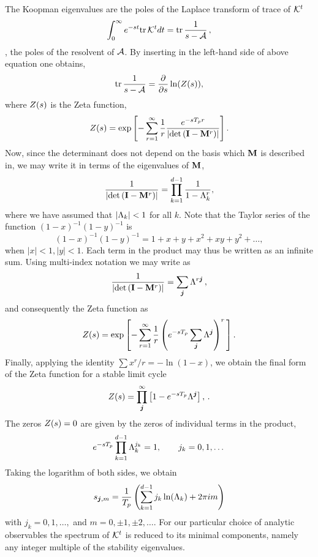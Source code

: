 \begin{description}
The Koopman eigenvalues are the poles of the
Laplace transform of trace of ${\cal K}^t$
%
\[
\int_0^\infty e^{-st} \mbox{\rm tr}\, {\cal K}^t dt =\mbox{\rm tr}\, \frac{1}{s-{\cal A}}
\,,
\]
%
\ie, the poles of the
resolvent of ${\cal A}$. By inserting  in the
left-hand side of above equation one obtains,
%
\[
\mbox{\rm tr}\, \frac{1}{s-{\cal A}} = \frac{\partial }{\partial s} \ln (Z(s)),
\]
%
where $Z(s)$ is the Zeta function,
%
\[
Z(s) = \exp \left [-\sum_{r=1}^\infty\frac {1}{r} \frac{e^{-s{T_{p}} r}}{|\mbox{\rm det}\,({\bf\mathbf{I}}-{\bf\mathbf{M}}^r)|}
         \right ].
\]
%
Now, since the determinant does not depend on the basis which ${\bf\mathbf{M}}$
is described in, we may write it in terms of the eigenvalues of
${\bf\mathbf{M}}$,
%
\begin{equation}
\frac{1}{|\mbox{\rm det}\, ({\bf\mathbf{I}}- {\bf\mathbf{M}}^r)|} = \prod_{k=1}^{d-1} \frac{1}{1-\Lambda_k^r},
\label{eq:prod2sum}
\end{equation}
%
where we have assumed that $|\Lambda_k|<1$ for all $k$. Note that
the Taylor series of the function $(1-x)^{-1}(1-y)^{-1} $ is
%
\[
(1-x)^{-1}(1-y)^{-1} = 1+x+y+ x^2 + xy + y^2+\dots,
\]
%
when $|x|<1,|y|<1$. Each term in the product  may
thus be written as an infinite sum.
Using multi-index notation  we may write
 as
%
\[
\frac{1}{|\mbox{\rm det}\,({\bf\mathbf{I}}-{\bf\mathbf{M}}^r)|}
= \sum_{{\boldsymbol j}} \Lambda^{r{\boldsymbol j}}
\,,
\]
%
and consequently the Zeta function  as
%
\[
Z(s) = \exp \left [-\sum_{r=1}^\infty\frac {1}{r}
  \left (e^{-s{T_{p}}}  \sum_{{\boldsymbol j}} \Lambda^{\boldsymbol j} \right )^r
             \,\right].
\]
%
Finally,  applying the identity $\sum x^r/r= -\ln(1-x)$,  we obtain
the final form of the Zeta function for a stable limit cycle
%
%
\begin{equation}
Z(s) 	= \prod_{{\boldsymbol j}}^\infty
   \left [1-e^{-s{T_{p}}} \Lambda^{\boldsymbol j}\right],
\label{eq:app:zeta2}
\,.
\end{equation}
%
The zeros $Z(s)=0$ are given by the zeros of individual terms in the
product, \ie
%
\[
e^{-s{T_{p}}}\prod_{k=1}^{d-1} \Lambda_k^{j_k} = 1, \qquad {j_k}=0,1,\dots
\]
%
Taking the logarithm of both sides, we obtain
%
\begin{equation}
s_{{\boldsymbol j},m}=\frac{1}{{T_{p}}}\left ( \sum_{k=1}^{d-1} {j_k}\ln (\Lambda_k) + 2\pi i m\right )
\label{eq:app:tr:limit:final}
\end{equation}
%
with ${j_k}=0,1,\dots,$ and $m=0,\pm 1, \pm2, \dots $. For our
particular choice of analytic observables the spectrum of ${\cal K}^t$ is
reduced to its minimal components, namely any integer multiple of
the stability eigenvalues.


\end{description}
